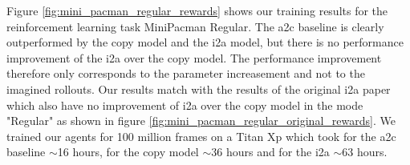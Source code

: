 
Figure \ref{fig:mini_pacman_regular_rewards} shows our training results for the reinforcement learning task MiniPacman Regular. The a2c baseline is clearly outperformed by the copy model and the i2a model, but there is no performance improvement of the i2a over the copy model. The performance improvement therefore only corresponds to the parameter increasement and not to the imagined rollouts. 
Our results match with the results of the original i2a paper which also have no improvement of i2a over the copy model in the mode "Regular" as shown in figure \ref{fig:mini_pacman_regular_original_rewards}.
We trained our agents for 100 million frames on a Titan Xp which took for the a2c baseline $\sim$16 hours, for the copy model $\sim$36 hours and for the i2a $\sim$63 hours.


